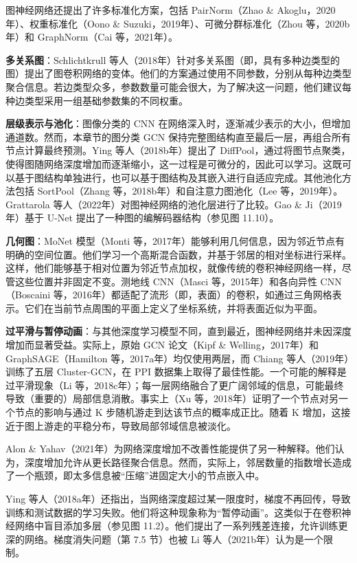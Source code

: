 图神经网络还提出了许多标准化方案，包括 PairNorm（Zhao \& Akoglu，2020年）、权重标准化（Oono \& Suzuki，2019年）、可微分群标准化（Zhou 等，2020b年）和 GraphNorm（Cai 等，2021年）。

\textbf{多关系图}：Schlichtkrull 等人（2018年）针对多关系图（即，具有多种边类型的图）提出了图卷积网络的变体。他们的方案通过使用不同参数，分别从每种边类型聚合信息。若边类型众多，参数数量可能会很大，为了解决这一问题，他们建议每种边类型采用一组基础参数集的不同权重。

\textbf{层级表示与池化}：图像分类的 CNN 在网络深入时，逐渐减少表示的大小，但增加通道数。然而，本章节的图分类 GCN 保持完整图结构直至最后一层，再组合所有节点计算最终预测。Ying 等人（2018b年）提出了 DiffPool，通过将图节点聚类，使得图随网络深度增加而逐渐缩小，这一过程是可微分的，因此可以学习。这既可以基于图结构单独进行，也可以基于图结构及其嵌入进行自适应完成。其他池化方法包括 SortPool（Zhang 等，2018b年）和自注意力图池化（Lee 等，2019年）。Grattarola 等人（2022年）对图神经网络的池化层进行了比较。Gao \& Ji（2019年）基于 U-Net 提出了一种图的编解码器结构（参见图 11.10）。

\textbf{几何图}：MoNet 模型（Monti 等，2017年）能够利用几何信息，因为邻近节点有明确的空间位置。他们学习一个高斯混合函数，并基于邻居的相对坐标进行采样。这样，他们能够基于相对位置为邻近节点加权，就像传统的卷积神经网络一样，尽管这些位置并非固定不变。测地线 CNN（Masci 等，2015年）和各向异性 CNN（Boscaini 等，2016年）都适配了流形（即，表面）的卷积，如通过三角网格表示。它们在当前节点周围的平面上定义了坐标系统，并将表面近似为平面。

\textbf{过平滑与暂停动画}：与其他深度学习模型不同，直到最近，图神经网络并未因深度增加而显著受益。实际上，原始 GCN 论文（Kipf \& Welling，2017年）和 GraphSAGE（Hamilton 等，2017a年）均仅使用两层，而 Chiang 等人（2019年）训练了五层 Cluster-GCN，在 PPI 数据集上取得了最佳性能。一个可能的解释是过平滑现象（Li 等，2018c年）；每一层网络融合了更广阔邻域的信息，可能最终导致（重要的）局部信息消散。事实上（Xu 等，2018年）证明了一个节点对另一个节点的影响与通过 K 步随机游走到达该节点的概率成正比。随着 K 增加，这接近于图上游走的平稳分布，导致局部邻域信息被淡化。

Alon \& Yahav（2021年）为网络深度增加不改善性能提供了另一种解释。他们认为，深度增加允许从更长路径聚合信息。然而，实际上，邻居数量的指数增长造成了一个瓶颈，即太多信息被“压缩”进固定大小的节点嵌入中。

Ying 等人（2018a年）还指出，当网络深度超过某一限度时，梯度不再回传，导致训练和测试数据的学习失败。他们将这种现象称为“暂停动画”。这类似于在卷积神经网络中盲目添加多层（参见图 11.2）。他们提出了一系列残差连接，允许训练更深的网络。梯度消失问题（第 7.5 节）也被 Li 等人（2021b年）认为是一个限制。


